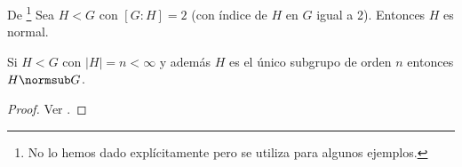 \begin{thm}
	\label{thm:indice2normal}
	De \cite[p.~91]{dor96}\footnote{No lo hemos dado explícitamente pero se utiliza para algunos ejemplos.}
	Sea $H < G$ con $[G : H] = 2$ (con índice de $H$ en $G$ igual a 2). Entonces $H$ es normal.
\end{thm}

\begin{pro}
	Si $H < G$ con $|H| = n < \infty$ y además $H$ es el único subgrupo de orden $n$ entonces $H \normsub G$.
\end{pro}

\begin{proof}
	Ver \cite[p.~91]{dor96}.
\end{proof}